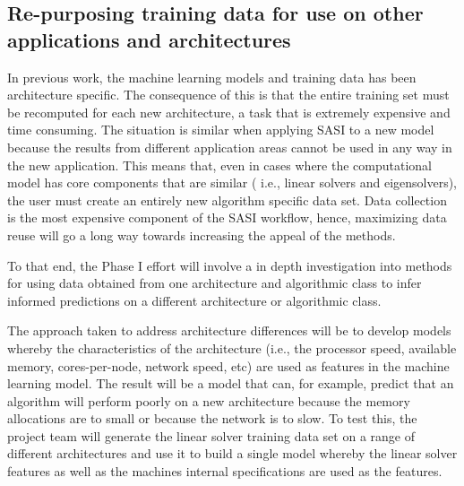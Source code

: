 \subsection{ Re-purposing training data for use on other applications and architectures }
\label{sec:reuse}
In previous work, the machine learning models and training data has been architecture specific. The consequence of this is that the entire training set must be recomputed for each new architecture, a task that is extremely expensive and time consuming. The situation is similar when applying SASI to a new model because the results from different application areas cannot be used in any way in the new application. This means that, even in cases where the computational model has core components that are similar ( i.e., linear solvers and eigensolvers), the user must create an entirely new algorithm specific data set. Data collection is the most expensive component of the SASI workflow, hence, maximizing data reuse will go a long way towards increasing the appeal of the methods. 

To that end, the Phase I effort will involve a in depth investigation into methods for using data obtained from one architecture and algorithmic class to infer informed predictions on a different architecture or algorithmic class.  

The approach taken to address architecture differences will be to develop models whereby the characteristics of the architecture (i.e., the processor speed, available memory, cores-per-node, network speed, etc) are used as features in the machine learning model. The result will be a model that can, for example, predict that an algorithm will perform poorly on a new architecture because the memory allocations are to small or because the network is to slow. To test this, the project team will generate the linear solver training data set on a range of different architectures and use it to build a single model whereby the linear solver features as well as the machines internal specifications are used as the features. 

